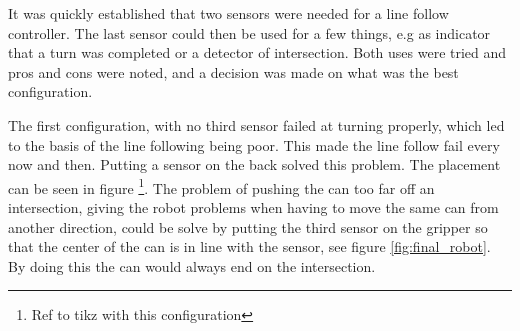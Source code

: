 It was quickly established that two sensors were needed for a line follow controller. The last sensor could then be used for a few things, e.g as indicator that a turn was completed or a detector of intersection. Both uses were tried and pros and cons were noted, and a decision was made on what was the best configuration.


The first configuration, with no third sensor failed at turning properly, which led to the basis of the line following being poor. This made the line follow fail every now and then. Putting a sensor on the back solved this problem. The placement can be seen in figure \footnote{Ref to tikz with this configuration}. The problem of pushing the can too far off an intersection, giving the robot problems when having to move the same can from another direction, could be solve by putting the third sensor on the gripper so that the center of the can is in line with the sensor, see figure \ref{fig:final_robot}. By doing this the can would always end on the intersection. 
